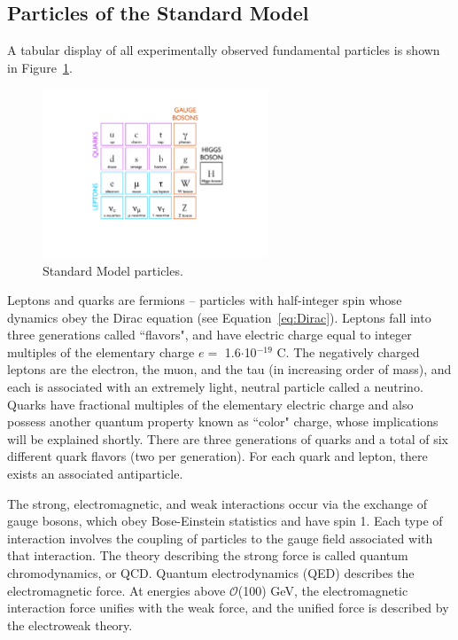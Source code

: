 \subsection{Particles of the Standard Model\label{sec:SM-particles}}

A tabular display of all experimentally observed fundamental particles is shown in Figure~\ref{fig:StandardModelTable}.

\begin{figure}
   \begin{center}
      \includegraphics[width=0.6\textwidth]{figures/StandardModelTable}
      \caption{Standard Model particles.}
      \label{fig:StandardModelTable}
   \end{center}
\end{figure}

Leptons and quarks are fermions -- particles with half-integer spin whose dynamics obey the Dirac equation (see Equation~\ref{eq:Dirac}). Leptons fall into three generations called ``flavors", and have electric charge equal to integer multiples of the elementary charge $e =$ 1.6$\cdot$10$^{-19}$ C. The negatively charged leptons are the electron, the muon, and the tau (in increasing order of mass), and each is associated with an extremely light, neutral particle called a neutrino. Quarks have fractional multiples of the elementary electric charge and also possess another quantum property known as ``color" charge, whose implications will be explained shortly. There are three generations of quarks and a total of six different quark flavors (two per generation). For each quark and lepton, there exists an associated antiparticle.

The strong, electromagnetic, and weak interactions occur via the exchange of gauge bosons, which obey Bose-Einstein statistics and have spin 1. Each type of interaction involves the coupling of particles to the gauge field associated with that interaction. The theory describing the strong force is called quantum chromodynamics, or QCD. Quantum electrodynamics (QED) describes the electromagnetic force. At energies above $\mathcal{O}$(100) GeV, the electromagnetic interaction force unifies with the weak force, and the unified force is described by the electroweak theory.


